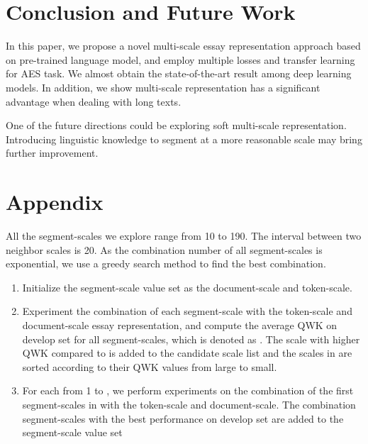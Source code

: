 \documentclass[11pt]{article}
\begin{document}
\section{Conclusion and Future Work}
In this paper, we propose a novel multi-scale essay representation approach based on pre-trained language model, and employ multiple losses and transfer learning for AES task.
We almost obtain the state-of-the-art result among deep learning models.
In addition, we show multi-scale representation has a significant advantage when dealing with long texts.

One of the future directions could be exploring soft multi-scale representation.
Introducing linguistic knowledge to segment at a more reasonable scale may bring further improvement.






\appendix

\section{Appendix}
\label{sec:appendix}

All the segment-scales we explore range from 10 to 190.
The interval between two neighbor scales is 20. As the combination number of all segment-scales is exponential, we use a greedy search method to find the best combination.
\begin{enumerate}
\item Initialize the segment-scale value set  as the document-scale and  token-scale.
\item Experiment the combination of each segment-scale with the token-scale and document-scale essay representation, and compute the average QWK on develop set for all segment-scales, which is denoted as .
The scale with higher QWK compared to  is added to the candidate scale list  and the scales in  are sorted according to their QWK values from large to small.
\item For each  from 1 to , we perform experiments on the combination of the first  segment-scales in  with the token-scale and document-scale.
The combination segment-scales with the best performance on develop set are added to the segment-scale value set 
\end{enumerate}
\end{document}
